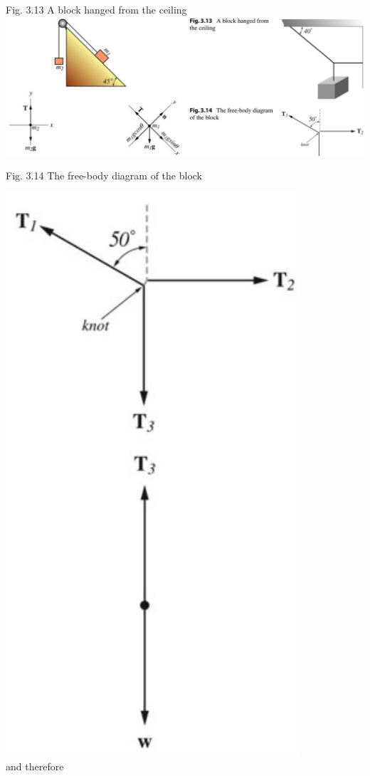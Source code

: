 \documentclass[10pt]{article}
\begin{document}
Fig. 3.13 A block hanged from the ceiling\\
\includegraphics[max width=\textwidth, center]{2024_09_13_db1f357d2aad0a03eb2eg-056(2)}

Fig. 3.14 The free-body diagram of the block

\includegraphics[max width=\textwidth, center]{2024_09_13_db1f357d2aad0a03eb2eg-056(1)}\\
and therefore
\end{document}
